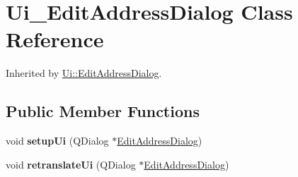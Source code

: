 \hypertarget{class_ui___edit_address_dialog}{}\section{Ui\+\_\+\+Edit\+Address\+Dialog Class Reference}
\label{class_ui___edit_address_dialog}


Inherited by \mbox{\hyperlink{class_ui_1_1_edit_address_dialog}{Ui\+::\+Edit\+Address\+Dialog}}.

\subsection*{Public Member Functions}
\begin{DoxyCompactItemize}
\item 
\mbox{\label{class_ui___edit_address_dialog_aeb81a265b35ce52ba0416149513d9002}} 
void {\bfseries setup\+Ui} (Q\+Dialog $\ast$\mbox{\hyperlink{class_edit_address_dialog}{Edit\+Address\+Dialog}})
\item 
\mbox{\label{class_ui___edit_address_dialog_ae004b0c88564fafb3661e58bd26afd3c}} 
void {\bfseries retranslate\+Ui} (Q\+Dialog $\ast$\mbox{\hyperlink{class_edit_address_dialog}{Edit\+Address\+Dialog}})
\end{DoxyCompactItemize}
